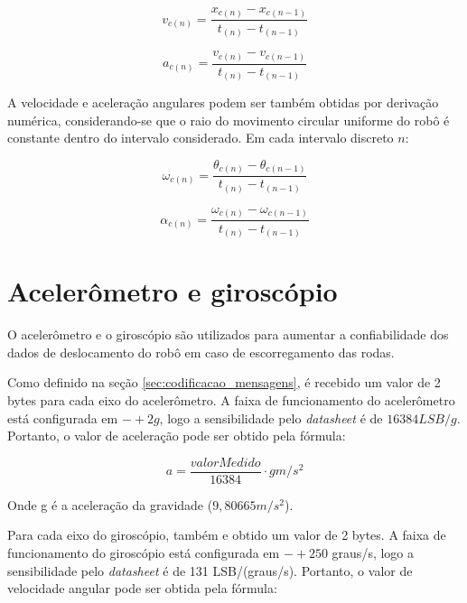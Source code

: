 \begin{equation}
  v_{c (n)} = \frac{x_{c (n)} - x_{c (n-1)}}{t_{(n)} - t_{(n-1)}}
  \label{eq:velocidade}
\end{equation}

\begin{equation}
  a_{c (n)} = \frac{v_{c (n)} - v_{c (n-1)}}{t_{(n)} - t_{(n-1)}}
  \label{eq:velocidade}
\end{equation}


A velocidade e aceleração angulares podem ser também obtidas por derivação numérica, considerando-se que o raio do movimento circular uniforme do robô é constante dentro do intervalo considerado. Em cada intervalo discreto $n$:

\begin{equation}
  \omega_{c (n)} = \frac{\theta_{c (n)} - \theta_{c (n-1)}}{t_{(n)} - t_{(n-1)}}
  \label{eq:velocidade}
\end{equation}

\begin{equation}
  \alpha_{c (n)} = \frac{\omega_{c (n)} - \omega_{c (n-1)}}{t_{(n)} - t_{(n-1)}}
  \label{eq:velocidade}
\end{equation}


\section{Acelerômetro e giroscópio}
\label{sec:teoria_acel_giro}

O acelerômetro e o giroscópio são utilizados para aumentar a confiabilidade dos dados de deslocamento do robô em caso de escorregamento das rodas.



Como definido na seção \ref{sec:codificacao_mensagens}, é recebido um valor de 2 bytes para cada eixo do acelerômetro. A faixa de funcionamento do acelerômetro está configurada em $-+2g$, logo a sensibilidade pelo \textit{datasheet} é de $16384 LSB/g$. Portanto, o valor de aceleração pode ser obtido pela fórmula:

\begin{equation}
  a = \frac{valorMedido}{16384} \cdot g \unit{m/s^2}
  \label{eq:acel}
\end{equation}

Onde g é a aceleração da gravidade ($9,80665 \unit{m/s^2}$). 

Para cada eixo do giroscópio, também e obtido um valor de 2 bytes. A faixa de funcionamento do giroscópio está configurada em $-+250$ graus/s, logo a sensibilidade pelo \textit{datasheet} é de 131 LSB/(graus/s). Portanto, o valor de velocidade angular pode ser obtida pela fórmula:

